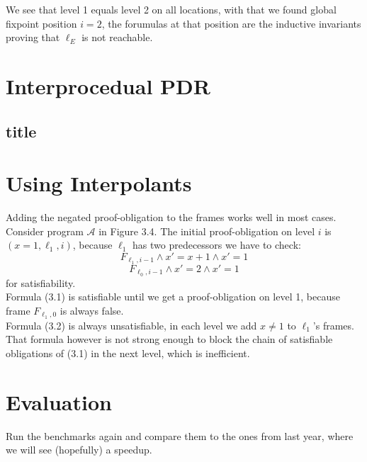 \documentclass{article}
\begin{document}
	\hspace*{5cm}
	
	We see that level 1 equals level 2 on all locations, with that we found global fixpoint position $i = 2$, the forumulas at that position are the inductive invariants proving that $\ell_E$ is not reachable.
	
	\section{Interprocedual PDR}
	
	
	\subsection{title}
	
	
	\section{Using Interpolants}
	Adding the negated proof-obligation to the frames works well in most cases. Consider program $\mathcal{A}$ in Figure 3.4. The initial proof-obligation on level $i$ is $(x = 1, \ell_1, i)$, because $\ell_1$ has two predecessors we have to check:
	\begin{equation}
	F_{\ell_1, i - 1} \land x' = x + 1 \land x' = 1
	\end{equation}
	\begin{equation}
	F_{\ell_0, i - 1} \land x' = 2 \land x' = 1
	\end{equation}
	for satisfiability. \\
	Formula (3.1) is satisfiable until we get a proof-obligation on level 1, because frame $F_{\ell_1, 0}$ is always false. \\
	Formula (3.2) is always unsatisfiable, in each level we add $x \neq 1$ to $\ell_1$'s frames. That formula however is not strong enough to block the chain of satisfiable obligations of (3.1) in the next level, which is inefficient.
	
	
	
	\section{Evaluation}
	Run the benchmarks again and compare them to the ones from last year, where we will see (hopefully) a speedup.
	
	\pagebreak
	



	
\end{document}
